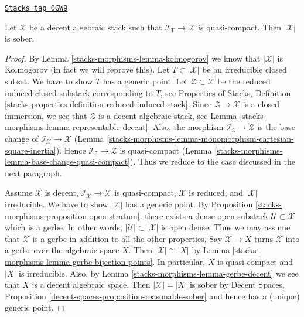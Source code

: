\begin{proposition}
\label{stacks-morphisms-proposition-decent-sober}
\href{https://stacks.math.columbia.edu/tag/0GW9}{\texttt{Stacks tag 0GW9}}

Let $\mathcal{X}$ be a decent algebraic stack such that
$\mathcal{I}_\mathcal{X} \to \mathcal{X}$ is quasi-compact.
Then $|\mathcal{X}|$ is sober.
\end{proposition}

\begin{proof}
By Lemma \ref{stacks-morphisms-lemma-kolmogorov} we know that $|\mathcal{X}|$ is Kolmogorov
(in fact we will reprove this).
Let $T \subset |\mathcal{X}|$ be an irreducible closed subset.
We have to show $T$ has a generic point.
Let $\mathcal{Z} \subset \mathcal{X}$ be the reduced induced
closed substack corresponding to $T$, see Properties of Stacks, Definition
\ref{stacks-properties-definition-reduced-induced-stack}.
Since $\mathcal{Z} \to \mathcal{X}$ is a closed immersion,
we see that $\mathcal{Z}$ is a decent algebraic stack, see
Lemma \ref{stacks-morphisms-lemma-representable-decent}.
Also, the morphism $\mathcal{I}_\mathcal{Z} \to \mathcal{Z}$
is the base change of $\mathcal{I}_\mathcal{X} \to \mathcal{X}$
(Lemma \ref{stacks-morphisms-lemma-monomorphism-cartesian-square-inertia}).
Hence $\mathcal{I}_\mathcal{Z} \to \mathcal{Z}$ is quasi-compact
(Lemma \ref{stacks-morphisms-lemma-base-change-quasi-compact}).
Thus we reduce to the case discussed in the next paragraph.

\medskip\noindent
Assume $\mathcal{X}$ is decent,
$\mathcal{I}_\mathcal{X} \to \mathcal{X}$ is quasi-compact,
$\mathcal{X}$ is reduced, and $|\mathcal{X}|$ irreducible.
We have to show $|\mathcal{X}|$ has a generic point.
By Proposition \ref{stacks-morphisms-proposition-open-stratum}.
there exists a dense open substack $\mathcal{U} \subset \mathcal{X}$
which is a gerbe. In other words, $|\mathcal{U}| \subset |\mathcal{X}|$
is open dense. Thus we may assume that $\mathcal{X}$ is a gerbe
in addition to all the other properties.
Say $\mathcal{X} \to X$ turns $\mathcal{X}$ into a gerbe over the
algebraic space $X$. Then $|\mathcal{X}| \cong |X|$ by
Lemma \ref{stacks-morphisms-lemma-gerbe-bijection-points}.
In particular, $X$ is quasi-compact and $|X|$ is irreducible.
Also, by Lemma \ref{stacks-morphisms-lemma-gerbe-decent}
we see that $X$ is a decent algebraic space.
Then $|\mathcal{X}| = |X|$ is sober by
Decent Spaces, Proposition \ref{decent-spaces-proposition-reasonable-sober}
and hence has a (unique) generic point.
\end{proof}

